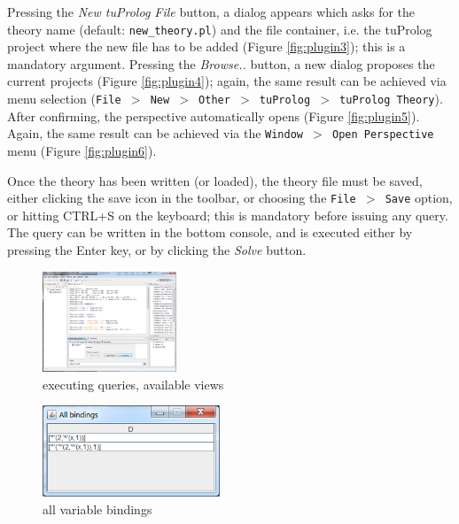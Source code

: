 Pressing the \textit{New tuProlog File} button, a dialog appears which asks for the theory name (default: \texttt{new\_theory.pl}) and the file container, i.e. the tuProlog project where the new file has to be added (Figure \ref{fig:plugin3}); this is a mandatory argument. Pressing the \textit{Browse..} button, a new dialog proposes the current \tuprolog{} projects (Figure \ref{fig:plugin4}); again, the same result can be achieved via menu selection  (\texttt{File $>$ New $>$ Other $>$ tuProlog $>$ tuProlog Theory}). After confirming, the \tuprolog{} perspective automatically opens (Figure \ref{fig:plugin5}). Again, the same result can be achieved via the \texttt{Window $>$ Open Perspective} menu (Figure \ref{fig:plugin6}).

Once the theory has been written (or loaded), the theory file must be saved, either clicking the save icon in the toolbar, or choosing the \texttt{File $>$ Save} option, or hitting CTRL+S on the keyboard; this is mandatory before issuing any query.
The query can be written in the bottom console, and is executed either by pressing the Enter key, or by clicking the \textit{Solve} button.


\begin{figure}
  \includegraphics[width=4cm]{images/plugin7.png}
  \caption{executing queries, available views}\label{fig:plugin7}
\end{figure}

\begin{figure}
  \includegraphics[width=200px]{images/plugin8.png}
  \caption{all variable bindings}\label{fig:plugin8}
\end{figure}

